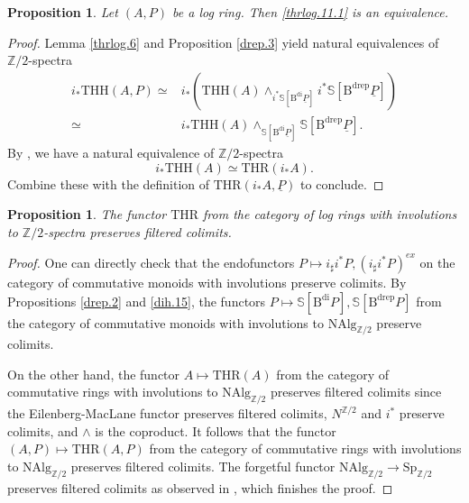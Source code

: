 \documentclass[10pt]{amsart}
\newtheorem{prop}[thm]{Proposition}
\theoremstyle{definition}
\theoremstyle{remark}
\numberwithin{equation}{section}
\newcommand{\Sphere}{\mathbb{S}}
\newcommand{\Z}{\mathbb{Z}}
\newcommand{\ul}{\underline}
\newcommand{\Sp}{\mathrm{Sp}}
\newcommand{\NAlg}{\mathrm{NAlg}}
\newcommand{\Bdi}{\mathrm{B}^{\mathrm{di}}}
\newcommand{\Bdrep}{\mathrm{B}^\mathrm{drep}}
\newcommand{\THH}{\mathrm{THH}}
\newcommand{\THR}{\mathrm{THR}}
\newcommand{\Ztwo}{{\mathbb{Z}/2}}
\begin{document}
\begin{prop}
\label{thrlog.3}
Let $(A,P)$ be a log ring.
Then \eqref{thrlog.11.1} is an equivalence.
\end{prop}
\begin{proof}
Lemma \ref{thrlog.6} and Proposition \ref{drep.3}
yield natural equivalences of $\Ztwo$-spectra
\begin{align*}
i_*\THH(A,P)
\simeq &
i_*(\THH(A)\wedge_{i^*\Sphere[\Bdi \ul{P}]}i^*\Sphere[\Bdrep \ul{P}])
\\
\simeq &
i_*\THH(A)\wedge_{\Sphere[\Bdi \ul{P}]}\Sphere[\Bdrep \ul{P}].
\end{align*}
By \cite[Propositions 2.1.4, 2.3.3]{THR},
we have a natural equivalence of $\Ztwo$-spectra
\[
i_*\THH(A)
\simeq
\THR(i_*A).
\]
Combine these with the definition of $\THR(i_*A,\ul{P})$ to conclude.
\end{proof}






\begin{prop}
\label{thrlog.4}
The functor $\THR$ from the category of log rings with involutions to $\Z/2$-spectra preserves filtered colimits.
\end{prop}
\begin{proof}
One can directly check that the endofunctors $P\mapsto i_\sharp i^*P, (i_\sharp i^*P)^{ex}$ on the category of commutative monoids with involutions preserve colimits.
By Propositions \ref{drep.2} and \ref{dih.15},
the functors $P\mapsto \Sphere[\Bdi P],\Sphere[\Bdrep P]$ from the category of commutative monoids with involutions to $\NAlg_{\Z/2}$ preserve colimits.

On the other hand,
the functor $A\mapsto \THR(A)$ from the category of commutative rings with involutions to $\NAlg_{\Z/2}$ preserves filtered colimits since the Eilenberg-MacLane functor preserves filtered colimits, $N^{\Z/2}$ and $i^*$ preserve colimits, and $\wedge$ is the coproduct.
It follows that the functor $(A,P)\mapsto \THR(A,P)$ from the category of commutative rings with involutions to $\NAlg_{\Z/2}$ preserves filtered colimits.
The forgetful functor $\NAlg_{\Z/2}\to \Sp_{\Z/2}$ preserves filtered colimits as observed in \cite[\S 1]{THR},
which finishes the proof.
\end{proof}
\end{document}
